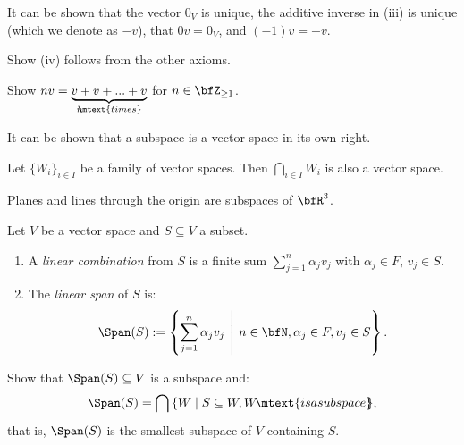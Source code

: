     It can be shown that the vector $0_V$ is unique, the additive inverse in (iii) is unique (which we denote as $-v$), that $0v = 0_V$, and $(-1)v = -v$.

    \begin{exercise}
        Show (iv) follows from the other axioms.
    \end{exercise}

    \begin{exercise}
        Show $nv = \underbrace{v + v + ... + v}_{n \hspace{-4pt}\mtext{times}}$ for $n \in \bfZ_{\geq 1}$.
    \end{exercise}

    It can be shown that a subspace is a vector space in its own right.

    \begin{example}
        Let $\{W_i\}_{i \in I}$ be a family of vector spaces. Then $\bigcap_{i \in I}W_i$ is also a vector space.
    \end{example}

    \begin{example}
        Planes and lines through the origin are subspaces of $\bfR^3$.
    \end{example}

    \begin{definition}
        Let $V$ be a vector space and $S \subseteq V$ a subset.
            \begin{enumerate}[label = (\arabic*),itemsep=1pt,topsep=3pt]
                \item A \textit{linear combination} from $S$ is a finite sum $\sum_{j = 1}^n \alpha_j v_j$ with $\alpha_j \in F$, $v_j \in S$.
                \item The \textit{linear span} of $S$ is:
                    \begin{equation*}
                    \begin{split}
                        \Span(S) := \left\{ \sum_{j = 1}^n \alpha_j v_j \hspace{4pt}\middle|\hspace{4pt} n \in \bfN, \alpha_j \in F, v_j \in S \right\}.
                    \end{split}
                    \end{equation*}
            \end{enumerate}
    \end{definition}

    \begin{exercise}
        Show that $\Span(S) \subseteq V$ is a subspace and:
            \begin{equation*}
            \begin{split}
                \Span(S) = \bigcap \hspace{2pt}\{W \mid S \subseteq W, W \hspace{-2pt}\mtext{is a subspace}\hspace{-4pt}\},
            \end{split}
            \end{equation*}
        that is, $\Span(S)$ is the smallest subspace of $V$ containing $S$.
    \end{exercise}

